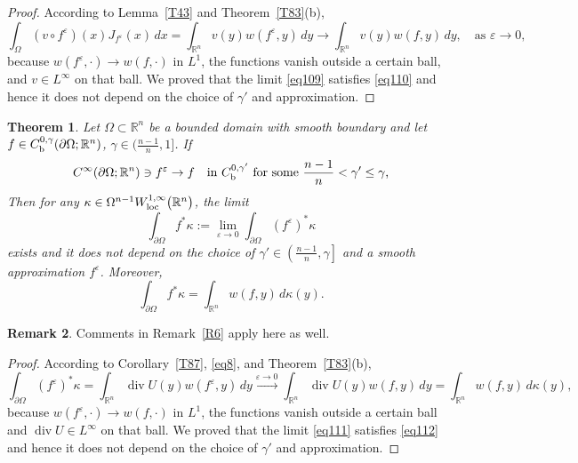 \documentclass[intlimits,12pt,reqno]{amsart}
\newcommand{\R}{\mathbb R}
\newcommand{\eps}{\varepsilon}
\numberwithin{equation}{section}
\newtheorem{theorem}{Theorem}[section]
\theoremstyle{definition}
\newtheorem{remark}[theorem]{Remark}
\begin{document}
\begin{proof}
According to Lemma~\ref{T43} and Theorem~\ref{T83}(b),
$$
\int_\Omega (v\circ f^\eps)(x)J_{f^\eps}(x)\, dx=\int_{\R^n}v(y)w(f^\eps,y)\,dy
\to \int_{\R^n} v(y)w(f,y)\, dy,
\quad
\text{as $\eps\to 0$,}
$$
because $w(f^\eps,\cdot)\to w(f,\cdot)$ in $L^1$, the functions vanish outside a certain ball, and $v\in L^\infty$ on that ball. 
We proved that the limit \eqref{eq109} satisfies \eqref{eq110} and hence it does not depend on the choice of $\gamma'$ and approximation.
\end{proof}
\begin{theorem}
\label{T89}
Let $\Omega\subset\R^n$ be a bounded domain with smooth boundary and let $f\in C_{\rm b}^{0,\gamma}(\partial\Omega;\R^n)$, $\gamma\in \big(\frac{n-1}{n},1\big]$.
If 
$$
C^\infty(\partial\Omega;\R^n)\ni f^\eps\to f
\quad
\text{in $C_{\rm b}^{0,\gamma'}$ for some $\frac{n-1}{n}<\gamma'\leq\gamma$,}
$$
Then for any $\kappa\in \Omega^{n-1}W^{1,\infty}_{\rm loc}\big(\R^n\big)$, the limit
\begin{equation}
\label{eq111}
\int_{\partial\Omega} f^*\kappa:=\lim_{\eps\to 0} \int_{\partial\Omega} (f^\eps)^*\kappa
\end{equation}
exists and it does not depend on the choice of $\gamma'\in \left(\frac{n-1}{n},\gamma\right]$ and a smooth approximation $f^\eps$. Moreover,
\begin{equation}
\label{eq112}
\int_{\partial\Omega} f^*\kappa=\int_{\R^n} w(f,y)\, d\kappa(y).
\end{equation}
\end{theorem}
\begin{remark}
Comments in Remark~\ref{R6} apply here as well.
\end{remark}
\begin{proof}
According to Corollary~\ref{T87}, \eqref{eq8}, and Theorem~\ref{T83}(b),
$$
\int_{\partial\Omega} (f^\eps)^*\kappa=
\int_{\R^n}\operatorname{div}U(y)w(f^\eps,y)\, dy\stackrel{\eps\to 0}{\longrightarrow}
\int_{\R^n}\operatorname{div}U(y)w(f,y)\, dy=
\int_{\R^n}w(f,y)\, d\kappa(y), 
$$
because $w(f^\eps,\cdot)\to w(f,\cdot)$ in $L^1$, the functions vanish outside a certain ball and $\operatorname{div}U\in L^\infty$ on that ball.
We proved that the limit \eqref{eq111} satisfies \eqref{eq112} and hence it does not depend on the choice of $\gamma'$ and approximation.
\end{proof}
\end{document}
